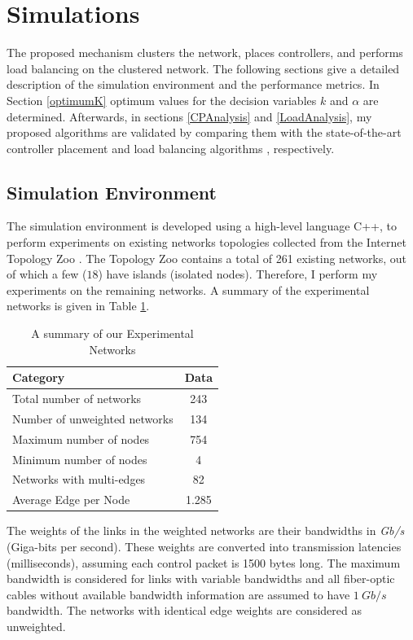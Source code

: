 \documentclass[journal]{IEEEtran}
\begin{document}
\section{Simulations} \label{simulations}

The proposed mechanism clusters the network, places controllers, and performs load balancing on the clustered network. The following sections give a detailed description of the simulation environment and the performance metrics. In Section \ref{optimumK} optimum values for the decision variables $k$ and $\alpha$ are determined. Afterwards, in sections \ref{CPAnalysis} and \ref{LoadAnalysis}, my proposed algorithms are validated by comparing them with the state-of-the-art controller placement \cite{dbcp2017} and load balancing algorithms \cite{filali2018sdn}, respectively.

\subsection{Simulation Environment}
The simulation environment is developed using a high-level language C++, to perform experiments on existing networks topologies collected from the Internet Topology Zoo \cite{knight2011internet}. The Topology Zoo contains a total of 261 existing networks, out of which a few ($18$) have islands (isolated nodes). Therefore, I perform my experiments on the remaining networks. A summary of the experimental networks is given in Table \ref{tab:zooSummary}.
\begin{table}
	\centering
	\caption{A summary of our Experimental Networks} \label{tab:zooSummary}
	\begin{tabular}{|l|c|}
		\hline
		\textbf{Category} & \textbf{Data} \\
		\hline
		Total number of networks & 243 \\
		\hline
		Number of unweighted networks & 134 \\
		\hline
		Maximum number of nodes & 754 \\
		\hline
		Minimum number of nodes & 4 \\
		\hline
		Networks with multi-edges & 82\\
		\hline
		Average Edge per Node & 1.285 \\
		\hline
	\end{tabular}
\end{table}

The weights of the links in the weighted networks are their bandwidths in \textit{Gb/s} (Giga-bits per second). These weights are converted into transmission latencies (milliseconds), assuming each control packet is 1500 bytes long. The maximum bandwidth is considered for links with variable bandwidths and all fiber-optic cables without available bandwidth information are assumed to have $1~Gb/s$ bandwidth. The networks with identical edge weights are considered as unweighted.
\end{document}
